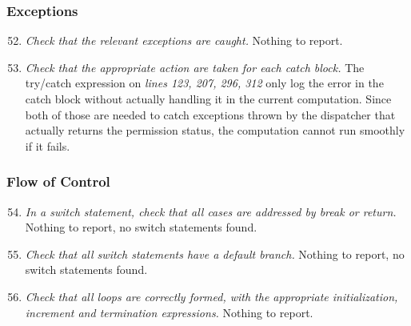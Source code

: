 	\subsubsection{Exceptions}
		\begin{enumerate}
			\setcounter{enumi}{51}
			\item \textit{Check that the relevant exceptions are caught.}\newline
			Nothing to report. %

			\item \textit{Check that the appropriate action are taken for each catch block.}\newline
			The try/catch expression on \textit{lines 123, 207, 296, 312} only log the error in the catch block without actually handling it in the current computation. Since both of those are needed to catch exceptions thrown by the dispatcher that actually returns the permission status, the computation cannot run smoothly if it fails. 

		\end{enumerate}

	\subsubsection{Flow of Control}
		\begin{enumerate}
			\setcounter{enumi}{53}
			\item \textit{In a switch statement, check that all cases are addressed by break or return.}\newline
			Nothing to report, no switch statements found. %

			\item \textit{Check that all switch statements have a default branch.}\newline
			Nothing to report, no switch statements found. %

			\item \textit{Check that all loops are correctly formed, with the appropriate initialization, increment and termination expressions.}\newline
			Nothing to report. %

		\end{enumerate}


